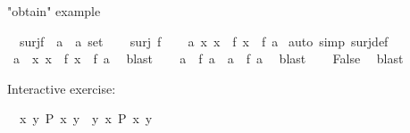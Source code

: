 \begin{isabellebody}
\isamarkupfalse%
%
\endisatagproof
{\isafoldproof}%
%
\isadelimproof
%
\endisadelimproof
%
\begin{isamarkuptext}%
"obtain" example%
\end{isamarkuptext}\isamarkuptrue%
\isamarkupfalse%
\ {\isachardoublequoteopen}{\isasymnot}\ surj{\isacharparenleft}{\kern0pt}f\ {\isacharcolon}{\kern0pt}{\isacharcolon}{\kern0pt}\ {\isacharprime}{\kern0pt}a\ {\isasymRightarrow}\ {\isacharprime}{\kern0pt}a\ set{\isacharparenright}{\kern0pt}{\isachardoublequoteclose}\isanewline
%
\isadelimproof
%
\endisadelimproof
%
\isatagproof
{}\isamarkupfalse%
\isanewline
\ \ \isamarkupfalse%
\ {\isachardoublequoteopen}surj\ f{\isachardoublequoteclose}\isanewline
\ \ \isamarkupfalse%
\ {\isachardoublequoteopen}{\isasymexists}a{\isachardot}{\kern0pt}\ {\isacharbraceleft}{\kern0pt}x{\isachardot}{\kern0pt}\ x\ {\isasymnotin}\ f\ x{\isacharbraceright}{\kern0pt}\ {\isacharequal}{\kern0pt}\ f\ a{\isachardoublequoteclose}\ \isamarkupfalse%
{\isacharparenleft}{\kern0pt}auto\ simp{\isacharcolon}{\kern0pt}\ surj{\isacharunderscore}{\kern0pt}def{\isacharparenright}{\kern0pt}\isanewline
\ \ \isamarkupfalse%
\ \isamarkupfalse%
\ a\ \ {\isachardoublequoteopen}{\isacharbraceleft}{\kern0pt}x{\isachardot}{\kern0pt}\ x\ {\isasymnotin}\ f\ x{\isacharbraceright}{\kern0pt}\ {\isacharequal}{\kern0pt}\ f\ a{\isachardoublequoteclose}\ \isamarkupfalse%
\ blast\isanewline
\ \ \isamarkupfalse%
\ {\isachardoublequoteopen}a\ {\isasymnotin}\ f\ a\ {\isasymlongleftrightarrow}\ a\ {\isasymin}\ f\ a{\isachardoublequoteclose}\ \isamarkupfalse%
\ blast\isanewline
\ \ \isamarkupfalse%
\ {\isachardoublequoteopen}False{\isachardoublequoteclose}\ \isamarkupfalse%
\ blast\isanewline
{}\isamarkupfalse%
%
\endisatagproof
{\isafoldproof}%
%
\isadelimproof
%
\endisadelimproof
%
\begin{isamarkuptext}%
Interactive exercise:%
\end{isamarkuptext}\isamarkuptrue%
\isamarkupfalse%
\ \ {\isachardoublequoteopen}{\isasymexists}x{\isachardot}{\kern0pt}\ {\isasymforall}y{\isachardot}{\kern0pt}\ P\ x\ y{\isachardoublequoteclose}\ \ {\isachardoublequoteopen}{\isasymforall}y{\isachardot}{\kern0pt}\ {\isasymexists}x{\isachardot}{\kern0pt}\ P\ x\ y{\isachardoublequoteclose}\isanewline
%
\isadelimproof

\end{isabellebody}
